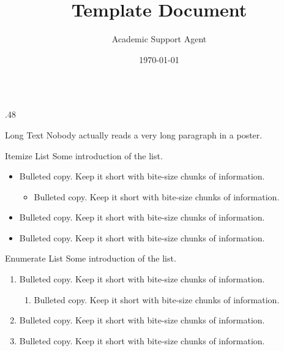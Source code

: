 \documentclass{article}
\title{Template Document}
\author{Academic Support Agent}
\date{\today}
\begin{document}
\maketitle

\begin{frame}{}
    \begin{columns}[c]
    \begin{column}{.48\linewidth}
    \begin{block}{\large Long Text}
        Nobody actually reads a very long paragraph in a poster.

        \bigskip

        \lipsum[3]
    \end{block}

    \begin{block}{Itemize List}
        Some introduction of the list.
        \begin{itemize}
            \item Bulleted copy. Keep it short with bite-size chunks of information.
            \begin{itemize}
                \item Bulleted copy. Keep it short with bite-size chunks of information.
            \end{itemize}
            \item Bulleted copy. Keep it short with bite-size chunks of information.
            \item Bulleted copy. Keep it short with bite-size chunks of information.
        \end{itemize}
    \end{block}

    \begin{block}{Enumerate List}
        Some introduction of the list.
        \begin{enumerate}
            \item Bulleted copy. Keep it short with bite-size chunks of information.
            \begin{enumerate}
                \item Bulleted copy. Keep it short with bite-size chunks of information.
            \end{enumerate}
            \item Bulleted copy. Keep it short with bite-size chunks of information.
            \item Bulleted copy. Keep it short with bite-size chunks of information.
        \end{enumerate}
    \end{block}


\end{column}
\end{columns}
\end{frame}
\end{document}
